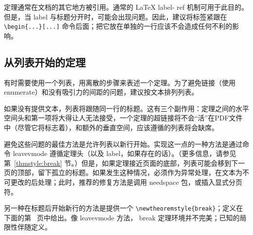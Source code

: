 \documentclass{article}
\newcommand{\ntt}{%
  \fontfamily\ttdefault \fontseries\mddefault \fontshape\updefault
  \selectfont
}
\DeclareRobustCommand{\cn}[1]{{\ntt\bslchar#1}}
\DeclareRobustCommand{\pkg}[1]{{\ntt#1}}
\DeclareRobustCommand{\env}[1]{{\ntt#1}}
\def\latex/{{\protect\LaTeX}}
\begin{document}
定理通常在文档的其它地方被引用。通常的 \latex/ \cn{label}-\cn{ref} 机制可用于此目的。
但是，当 \cn{label} 与标题分开时，可能会出现问题。因此，建议将标签紧跟在 \verb+\begin{...}[...]+ 命令后面；把它放在单独的一行应该不会造成任何不利的影响。

\subsection{从列表开始的定理}
\label{ThmWithList}

有时需要使用一个列表，用离散的步骤来表述一个定理。为了避免链接（使用 \env{enumerate}）和没有吸引力的间距的问题，建议按文本排列列表。

如果没有提供文本，列表将跟随同一行的标题。这有三个副作用：定理之间的水平空间头和第一项将大得让人无法接受，一个定理的超链接将不会“活”在PDF文件中（尽管它将标志着），和额外的垂直空间，应该遵循的列表将会缺席。

避免这些问题的最佳方法是允许列表以新行开始。实现这一点的一种方法是通过命令 \cn{leavevmode} 遵循定理头（以及 \cn{label}，如果存在的话）。（更多信息，请参见第~\ref{thmstyle:break} 节。）但是，如果定理接近页面的底部，列表可能会移到下一页的顶部，留下孤立的标题。如果发生这种情况，必须作为异常处理，在文本为不可更改的后处理；此时，推荐的修复方法是调用 \pkg{needspace} \cite{NDS} 包，或插入显式分页符。

另一种在标题后开始新行的方法是提供一个 \verb+\newtheoremstyle{break}+；定义在下面的第~\pageref{thmstyle:break} 页中给出。像 \cn{leavevmode} 方法，\env{break} 定理环境并不完美；已知的局限性伴随定义。



\end{document}
